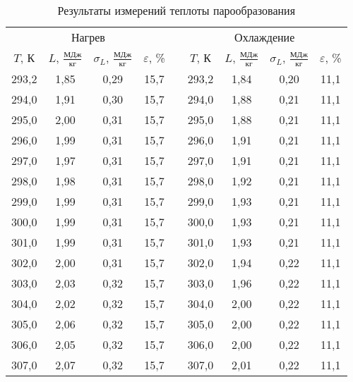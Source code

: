 \documentclass[a4paper,12pt]{article} %
\begin{document}
\begin{table}[H]
	\caption{Результаты измерений теплоты парообразования}
	\label{tab:results}
	\centering
	\begin{tabular}{|c|c|c|c|c|c|c|c|c|}
		\cline{1-4} \cline{6-9}
		\multicolumn{4}{|c|}{Нагрев} &  & \multicolumn{4}{c|}{Охлаждение} \\ \cline{1-4} \cline{6-9} 
		$ T $, К & $ L $, $ \displaystyle \frac{\text{МДж}}{\text{кг}} $ & $ \sigma_L $, $ \displaystyle\frac{\text{МДж}}{\text{кг}} $ & $ \varepsilon $, \% &  & $ T $, К & $ L $, $\displaystyle \frac{\text{МДж}}{\text{кг}} $ & $ \sigma_L $, $\displaystyle \frac{\text{МДж}}{\text{кг}} $ & $ \varepsilon $, \% \\ \cline{1-4} \cline{6-9} 
		293,2 & 1,85 & 0,29 & 15,7 &  & 293,2 & 1,84 & 0,20 & 11,1 \\ \cline{1-4} \cline{6-9} 
		294,0 & 1,91 & 0,30 & 15,7 &  & 294,0 & 1,88 & 0,21 & 11,1 \\ \cline{1-4} \cline{6-9} 
		295,0 & 2,00 & 0,31 & 15,7 &  & 295,0 & 1,88 & 0,21 & 11,1 \\ \cline{1-4} \cline{6-9} 
		296,0 & 1,99 & 0,31 & 15,7 &  & 296,0 & 1,91 & 0,21 & 11,1 \\ \cline{1-4} \cline{6-9} 
		297,0 & 1,97 & 0,31 & 15,7 &  & 297,0 & 1,91 & 0,21 & 11,1 \\ \cline{1-4} \cline{6-9} 
		298,0 & 1,98 & 0,31 & 15,7 &  & 298,0 & 1,92 & 0,21 & 11,1 \\ \cline{1-4} \cline{6-9} 
		299,0 & 1,99 & 0,31 & 15,7 &  & 299,0 & 1,93 & 0,21 & 11,1 \\ \cline{1-4} \cline{6-9} 
		300,0 & 1,99 & 0,31 & 15,7 &  & 300,0 & 1,93 & 0,21 & 11,1 \\ \cline{1-4} \cline{6-9} 
		301,0 & 1,99 & 0,31 & 15,7 &  & 301,0 & 1,93 & 0,21 & 11,1 \\ \cline{1-4} \cline{6-9} 
		302,0 & 2,00 & 0,31 & 15,7 &  & 302,0 & 1,94 & 0,22 & 11,1 \\ \cline{1-4} \cline{6-9} 
		303,0 & 2,03 & 0,32 & 15,7 &  & 303,0 & 1,96 & 0,22 & 11,1 \\ \cline{1-4} \cline{6-9} 
		304,0 & 2,02 & 0,32 & 15,7 &  & 304,0 & 2,00 & 0,22 & 11,1 \\ \cline{1-4} \cline{6-9} 
		305,0 & 2,06 & 0,32 & 15,7 &  & 305,0 & 2,00 & 0,22 & 11,1 \\ \cline{1-4} \cline{6-9} 
		306,0 & 2,05 & 0,32 & 15,7 &  & 306,0 & 2,00 & 0,22 & 11,1 \\ \cline{1-4} \cline{6-9} 
		307,0 & 2,07 & 0,32 & 15,7 &  & 307,0 & 2,01 & 0,22 & 11,1 \\ \cline{1-4} \cline{6-9} 

\end{tabular}
\end{table}
\end{document}
